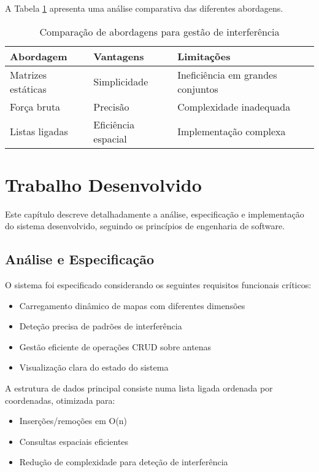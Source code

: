 \documentclass[a4paper,12pt]{report}
\begin{document}
A Tabela \ref{tab:comparativo} apresenta uma análise comparativa das diferentes abordagens.

\begin{table}[H]
\centering
\begin{tabular}{lll}
\toprule
\textbf{Abordagem} & \textbf{Vantagens} & \textbf{Limitações} \\
\midrule
Matrizes estáticas & Simplicidade & Ineficiência em grandes conjuntos \\
Força bruta & Precisão & Complexidade inadequada \\
Listas ligadas & Eficiência espacial & Implementação complexa \\
\bottomrule
\end{tabular}
\caption{Comparação de abordagens para gestão de interferência}
\label{tab:comparativo}
\end{table}

\chapter{Trabalho Desenvolvido}
Este capítulo descreve detalhadamente a análise, especificação e implementação do sistema desenvolvido, seguindo os princípios de engenharia de software.

\section{Análise e Especificação}
O sistema foi especificado considerando os seguintes requisitos funcionais críticos:
\begin{itemize}
    \item Carregamento dinâmico de mapas com diferentes dimensões
    \item Deteção precisa de padrões de interferência
    \item Gestão eficiente de operações CRUD sobre antenas
    \item Visualização clara do estado do sistema
\end{itemize}

A estrutura de dados principal consiste numa lista ligada ordenada por coordenadas, otimizada para:
\begin{itemize}
    \item Inserções/remoções em O(n)
    \item Consultas espaciais eficientes
    \item Redução de complexidade para deteção de interferência
\end{itemize}
\end{document}
